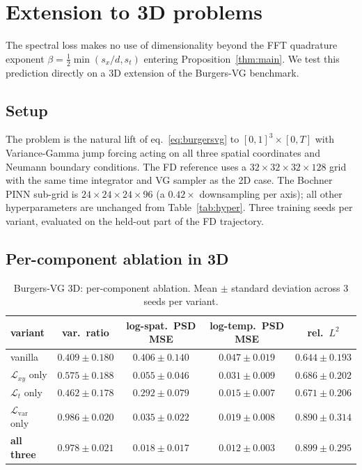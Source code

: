 \documentclass[review,12pt]{elsarticle}
\begin{document}
\section{Extension to 3D problems}
\label{sec:3d}

The spectral loss makes no use of dimensionality beyond the FFT
quadrature exponent
\(\beta = \tfrac{1}{2}\min(s_x/d, s_t)\) entering
Proposition~\ref{thm:main}. We test this prediction directly on a 3D
extension of the Burgers-VG benchmark.

\subsection{Setup}
\label{subsec:3d-setup}

The problem is the natural lift of eq.~\eqref{eq:burgersvg} to
\([0,1]^3 \times [0, T]\) with Variance-Gamma jump forcing acting on
all three spatial coordinates and Neumann boundary conditions. The FD
reference uses a \(32 \times 32 \times 32 \times 128\) grid with the
same time integrator and VG sampler as the 2D case. The Bochner
PINN sub-grid is \(24 \times 24 \times 24 \times 96\) (a
\(0.42\times\) downsampling per axis); all other hyperparameters are
unchanged from Table~\ref{tab:hyper}. Three training seeds per
variant, evaluated on the held-out part of the FD trajectory.

\subsection{Per-component ablation in 3D}

\begin{table}[h]
\centering
\caption{Burgers-VG 3D: per-component ablation. Mean \(\pm\) standard
deviation across 3 seeds per variant.}
\label{tab:burgers3d-ablation}
\begin{tabular}{l c c c c}
\toprule
variant & var.\ ratio & log-spat.\ PSD MSE & log-temp.\ PSD MSE & rel.\ \(L^2\) \\
\midrule
vanilla               & \(0.409 \pm 0.180\) & \(0.406 \pm 0.140\) & \(0.047 \pm 0.019\) & \(0.644 \pm 0.193\) \\
\(\mathcal{L}_{xy}\) only      & \(0.575 \pm 0.188\) & \(0.055 \pm 0.046\) & \(0.031 \pm 0.009\) & \(0.686 \pm 0.202\) \\
\(\mathcal{L}_{t}\) only       & \(0.462 \pm 0.178\) & \(0.292 \pm 0.079\) & \(0.015 \pm 0.007\) & \(0.671 \pm 0.206\) \\
\(\mathcal{L}_{\mathrm{var}}\) only & \(\mathbf{0.986 \pm 0.020}\) & \(0.035 \pm 0.022\) & \(0.019 \pm 0.008\) & \(0.890 \pm 0.314\) \\
\textbf{all three}          & \(\mathbf{0.978 \pm 0.021}\) & \(\mathbf{0.018 \pm 0.017}\) & \(\mathbf{0.012 \pm 0.003}\) & \(0.899 \pm 0.295\) \\
\bottomrule
\end{tabular}
\end{table}
\end{document}
